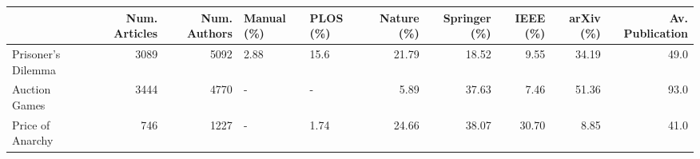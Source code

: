 \begin{tabular}{lrrllrrrrr}
\toprule
{} &  Num. Articles &  Num. Authors & Manual (\%) & PLOS (\%) &  Nature (\%) &  Springer (\%) &  IEEE (\%) &  arXiv (\%) &  Av. Publication \\
\midrule
Prisoner's Dilemma &           3089 &          5092 &       2.88 &     15.6 &       21.79 &         18.52 &      9.55 &      34.19 &             49.0 \\
Auction Games      &           3444 &          4770 &          - &        - &        5.89 &         37.63 &      7.46 &      51.36 &             93.0 \\
Price of Anarchy   &            746 &          1227 &          - &     1.74 &       24.66 &         38.07 &     30.70 &       8.85 &             41.0 \\
\bottomrule
\end{tabular}
